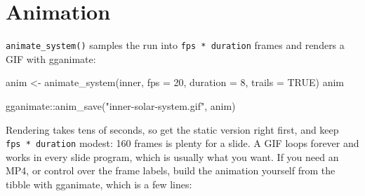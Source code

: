 \documentclass[
  10.5pt,
  letterpaper,
]{scrbook}
\newenvironment{Shaded}{\begin{snugshade}}{\end{snugshade}}
\newcommand{\AttributeTok}[1]{\textcolor[rgb]{0.00,0.00,0.00}{#1}}
\newcommand{\ConstantTok}[1]{\textcolor[rgb]{0.00,0.00,0.00}{#1}}
\newcommand{\DecValTok}[1]{\textcolor[rgb]{0.00,0.00,0.00}{#1}}
\newcommand{\FunctionTok}[1]{\textcolor[rgb]{0.00,0.00,0.00}{#1}}
\newcommand{\NormalTok}[1]{\textcolor[rgb]{0.00,0.00,0.00}{#1}}
\newcommand{\OtherTok}[1]{\textcolor[rgb]{0.00,0.00,0.00}{#1}}
\newcommand{\SpecialCharTok}[1]{\textcolor[rgb]{0.00,0.00,0.00}{#1}}
\newcommand{\StringTok}[1]{\textcolor[rgb]{0.00,0.00,0.00}{#1}}
\theoremstyle{plain}
\theoremstyle{remark}
\begin{document}
\section{Animation}\label{animation}

\texttt{animate\_system()} samples the run into
\texttt{fps\ *\ duration} frames and renders a GIF with gganimate:

\begin{Shaded}
\begin{Highlighting}[]
\NormalTok{anim }\OtherTok{\textless{}{-}} \FunctionTok{animate\_system}\NormalTok{(inner, }\AttributeTok{fps =} \DecValTok{20}\NormalTok{, }\AttributeTok{duration =} \DecValTok{8}\NormalTok{, }\AttributeTok{trails =} \ConstantTok{TRUE}\NormalTok{)}
\NormalTok{anim}
\end{Highlighting}
\end{Shaded}

\begin{Shaded}
\begin{Highlighting}[]
\NormalTok{gganimate}\SpecialCharTok{::}\FunctionTok{anim\_save}\NormalTok{(}\StringTok{"inner{-}solar{-}system.gif"}\NormalTok{, anim)}
\end{Highlighting}
\end{Shaded}

Rendering takes tens of seconds, so get the static version right first,
and keep \texttt{fps\ *\ duration} modest: 160 frames is plenty for a
slide. A GIF loops forever and works in every slide program, which is
usually what you want. If you need an MP4, or control over the frame
labels, build the animation yourself from the tibble with gganimate,
which is a few lines:
\end{document}
